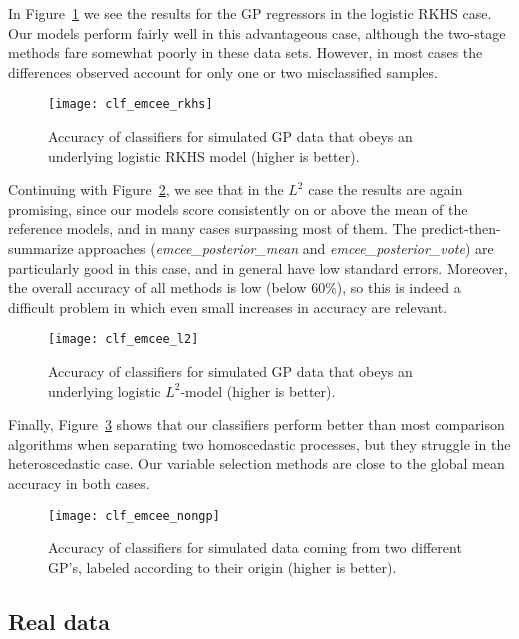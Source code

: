 In Figure~\ref{fig:clf_emcee_rkhs} we see the results for the GP regressors in the logistic RKHS case. Our models perform fairly well in this advantageous case, although the two-stage methods fare somewhat poorly in these data sets. However, in most cases the differences observed account for only one or two misclassified samples.

\begin{figure}[ht!]
  \centering
  \texttt{[image: clf\_emcee\_rkhs]}
  \caption{Accuracy of classifiers for simulated GP data that obeys an underlying logistic RKHS model (higher is better).}\label{fig:clf_emcee_rkhs}
\end{figure}

Continuing with Figure~\ref{fig:clf_emcee_l2}, we see that in the \(L^2\) case the results are again promising, since our models score consistently on or above the mean of the reference models, and in many cases surpassing most of them. The predict-then-summarize approaches (\textit{emcee\_posterior\_mean} and \textit{emcee\_posterior\_vote}) are particularly good in this case, and in general have low standard errors. Moreover, the overall accuracy of all methods is low (below 60\%), so this is indeed a difficult problem in which even small increases in accuracy are relevant.

\begin{figure}[ht!]
  \centering
  \texttt{[image: clf\_emcee\_l2]}
  \caption{Accuracy of classifiers for simulated GP data that obeys an underlying logistic \(L^2\)-model (higher is better).}\label{fig:clf_emcee_l2}
\end{figure}

Finally, Figure~\ref{fig:clf_emcee_nongp} shows that our classifiers perform better than most comparison algorithms when separating two homoscedastic processes, but they struggle in the heteroscedastic case. Our variable selection methods are close to the global mean accuracy in both cases.

\begin{figure}[ht!]
  \centering
  \texttt{[image: clf\_emcee\_nongp]}
  \caption{Accuracy of classifiers for simulated data coming from two different GP's, labeled according to their origin (higher is better).}\label{fig:clf_emcee_nongp}
\end{figure}

\subsection*{Real data}

